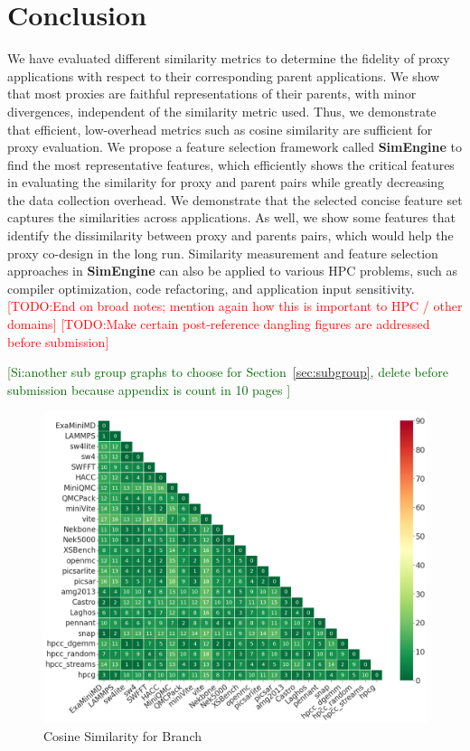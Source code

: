\documentclass[conference]{IEEEtran}
\newcommand{\commentout}[1]{}
\newcommand{\us}{\textbf{SimEngine}\xspace}
\newcommand{\si}[1]           {\textcolor{darkgreen}{[Si:#1]}}
\newcommand{\todo}[1]           {\textcolor{red}{[TODO:#1]}}
\begin{document}
\section{Conclusion}
We have evaluated different similarity metrics to determine the fidelity of proxy applications with respect to their corresponding parent applications.
%
We show that most proxies are faithful representations of their parents, with minor divergences, independent of the similarity metric used.  Thus, we demonstrate that efficient, low-overhead metrics such as cosine similarity are sufficient for proxy evaluation.
%
We propose a feature selection framework called \us to find the most representative features, which efficiently shows the critical features in evaluating the similarity for proxy and parent pairs while greatly decreasing the data collection overhead. 
%
We demonstrate that the selected concise feature set captures the similarities across applications.
%
As well, we show some features that identify the dissimilarity between proxy and parents pairs, which would help the proxy co-design in the long run.
%
Similarity measurement and feature selection approaches in \us can also be applied to various HPC problems, such as compiler optimization, code refactoring, and application input sensitivity.
\todo{End on broad notes; mention again how this is important to HPC / other domains}
\todo{Make certain post-reference dangling figures are addressed before submission}
\commentout{ %
\section{Acknowledgment}
}

\small







\appendix
\si{another sub group graphs to choose for Section~\ref{sec:subgroup}, delete before submission because appendix is count in 10 pages }
\begin{figure}[ht]
\centering
\includegraphics[width=0.9\linewidth]{figs/Branch.png}
\caption{Cosine Similarity for Branch }
\label{figs:cosine Branch}
\end{figure} 
\end{document}
